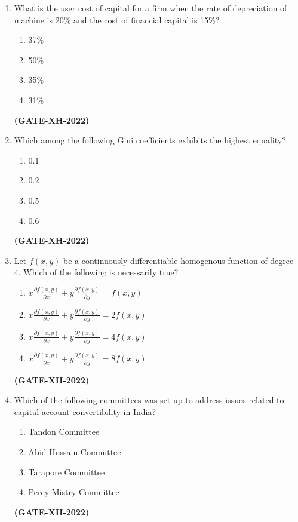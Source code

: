 \documentclass[journal]{IEEEtran}
\begin{document}
\begin{enumerate}
\item What is the user cost of capital for a firm when the rate of depreciation of machine is 20\% and the cost of financial capital is 15\%?
\begin{multicols}{2}
\begin{enumerate}
\item 37\%
\item 50\%
\item 35\%
\item 31\%
\end{enumerate}
\end{multicols}
\hfill\textbf{(GATE-XH-2022)}

\item Which among the following Gini coefficients exhibits the highest equality?
\begin{multicols}{2}
\begin{enumerate}
\item 0.1
\item 0.2
\item 0.5
\item 0.6
\end{enumerate}
\end{multicols}
\hfill\textbf{(GATE-XH-2022)}

\item Let $f(x, y)$ be a continuously differentiable homogenous function of degree 4. Which of the following is necessarily true?
\begin{multicols}{2}
\begin{enumerate}
\item $\displaystyle x \frac{\partial f(x, y)}{\partial x} + y \frac{\partial f(x, y)}{\partial y} = f(x, y)$
\item $\displaystyle x \frac{\partial f(x, y)}{\partial x} + y \frac{\partial f(x, y)}{\partial y} = 2f(x, y)$
\item $\displaystyle x \frac{\partial f(x, y)}{\partial x} + y \frac{\partial f(x, y)}{\partial y} = 4f(x, y)$
\item $\displaystyle x \frac{\partial f(x, y)}{\partial x} + y \frac{\partial f(x, y)}{\partial y} = 8f(x, y)$
\end{enumerate}
\end{multicols}
\hfill\textbf{(GATE-XH-2022)}

\item Which of the following committees was set-up to address issues related to capital account convertibility in India?
\begin{multicols}{2}
\begin{enumerate}
\item Tandon Committee
\item Abid Hussain Committee
\item Tarapore Committee
\item Percy Mistry Committee
\end{enumerate}
\end{multicols}
\hfill\textbf{(GATE-XH-2022)}


\end{enumerate}
\end{document}
